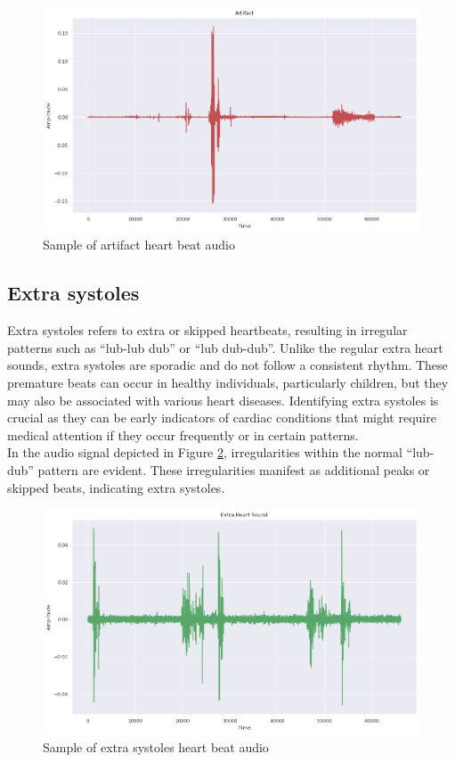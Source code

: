 \begin{figure}[H]
    \centering
    \includegraphics[width=.8\columnwidth]{../images/artifact_heart_beat_audio.png}
    \caption{Sample of artifact heart beat audio }\label{fig:artifact_heart_beat_audio}
\end{figure}
\noindent
\subsection{Extra systoles}
Extra systoles refers to extra or skipped heartbeats, resulting in irregular patterns such as ``lub-lub dub'' or ``lub dub-dub''.
Unlike the regular extra heart sounds, extra systoles are sporadic and do not follow a consistent rhythm.
These premature beats can occur in healthy individuals, particularly children, but they may also be associated with various heart diseases.
Identifying extra systoles is crucial as they can be early indicators of cardiac conditions that might require medical attention
if they occur frequently or in certain patterns.\\
In the audio signal depicted in Figure \ref{fig:extrastoles_heart_beat_audio}, irregularities within the normal “lub-dub” pattern are evident.
These irregularities manifest as additional peaks or skipped beats, indicating extra systoles.
\begin{figure}[H]
    \centering
    \includegraphics[width=.8\columnwidth]{../images/extrahls_heart_beat_audio.png}
    \caption{Sample of extra systoles heart beat audio }\label{fig:extrastoles_heart_beat_audio}
\end{figure}
\noindent
